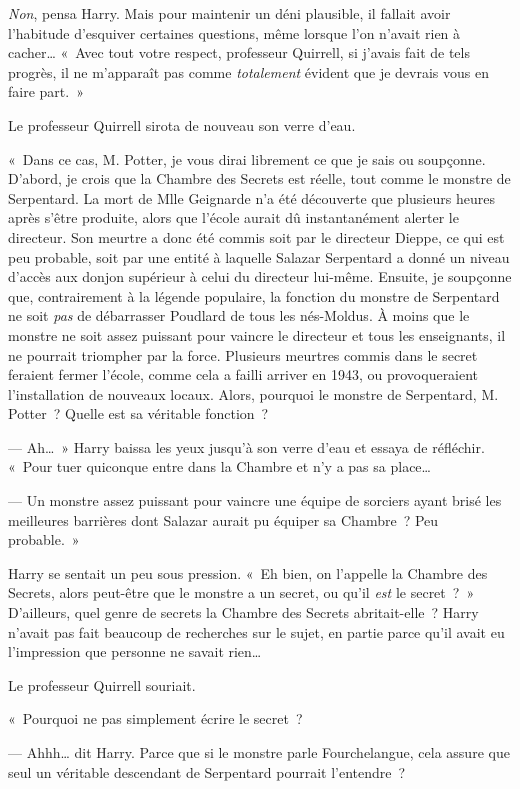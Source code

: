 \emph{Non}, pensa Harry. Mais pour maintenir un déni plausible, il fallait avoir l'habitude d'esquiver certaines questions, même lorsque l'on n'avait rien à cacher… «~Avec tout votre respect, professeur Quirrell, si j'avais fait de tels progrès, il ne m'apparaît pas comme \emph{totalement} évident que je devrais vous en faire part.~»

Le professeur Quirrell sirota de nouveau son verre d'eau.

«~Dans ce cas, M. Potter, je vous dirai librement ce que je sais ou soupçonne. D'abord, je crois que la Chambre des Secrets est réelle, tout comme le monstre de Serpentard. La mort de Mlle Geignarde n'a été découverte que plusieurs heures après s'être produite, alors que l'école aurait dû instantanément alerter le directeur. Son meurtre a donc été commis soit par le directeur Dieppe, ce qui est peu probable, soit par une entité à laquelle Salazar Serpentard a donné un niveau d'accès aux donjon supérieur à celui du directeur lui-même. Ensuite, je soupçonne que, contrairement à la légende populaire, la fonction du monstre de Serpentard ne soit \emph{pas} de débarrasser Poudlard de tous les nés-Moldus. À moins que le monstre ne soit assez puissant pour vaincre le directeur et tous les enseignants, il ne pourrait triompher par la force. Plusieurs meurtres commis dans le secret feraient fermer l'école, comme cela a failli arriver en 1943, ou provoqueraient l'installation de nouveaux locaux. Alors, pourquoi le monstre de Serpentard, M. Potter~? Quelle est sa véritable fonction~?

--- Ah…~» Harry baissa les yeux jusqu'à son verre d'eau et essaya de réfléchir. «~Pour tuer quiconque entre dans la Chambre et n'y a pas sa place…

--- Un monstre assez puissant pour vaincre une équipe de sorciers ayant brisé les meilleures barrières dont Salazar aurait pu équiper sa Chambre~? Peu probable.~»

Harry se sentait un peu sous pression. «~Eh bien, on l'appelle la Chambre des Secrets, alors peut-être que le monstre a un secret, ou qu'il \emph{est} le secret~?~» D'ailleurs, quel genre de secrets la Chambre des Secrets abritait-elle~? Harry n'avait pas fait beaucoup de recherches sur le sujet, en partie parce qu'il avait eu l'impression que personne ne savait rien…

Le professeur Quirrell souriait.

«~Pourquoi ne pas simplement écrire le secret~?

--- Ahhh… dit Harry. Parce que si le monstre parle Fourchelangue, cela assure que seul un véritable descendant de Serpentard pourrait l'entendre~?

